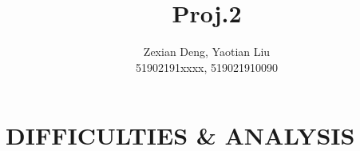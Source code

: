 \documentclass[conference]{IEEEtran}
\begin{document}
\title{Proj.2}

\author{Zexian Deng, Yaotian Liu \\  51902191xxxx, 519021910090}
\date{}

\maketitle



\section{DIFFICULTIES \& ANALYSIS}







\printbibliography
\end{document}
